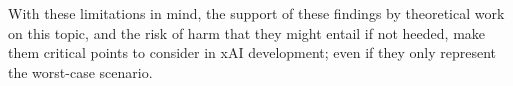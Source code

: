 With these limitations in mind, the support of these findings by theoretical work on this topic, and the risk of harm that they might entail if not heeded, make them critical points to consider in xAI development; even if they only represent the worst-case scenario.




% 

